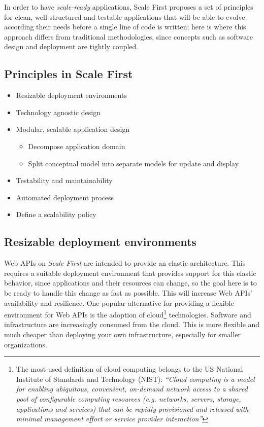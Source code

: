 \documentclass[10pt,article]{IEEEtran}
\begin{document}
In order to have \textit{scale-ready} applications, Scale First proposes a set of principles for clean, well-structured and testable applications that will be able to evolve according their needs before a single line of code is written; here is where this approach differs from traditional methodologies, since concepts such as software design and deployment are tightly coupled. 

 
\subsection{Principles in Scale First}
\begin{itemize}
    \item Resizable deployment environments
    \item Technology agnostic design
    \item Modular, scalable application design
    \begin{itemize}
        \item Decompose application domain 
        \item Split conceptual model into separate models for update and display
    \end{itemize}
    \item Testability and maintainability
    \item Automated deployment process
    \item Define a scalability policy
\end{itemize}

\subsection{Resizable deployment environments}
Web APIs on \textit{Scale First} are intended to provide an elastic architecture. This requires a suitable deployment environment that provides support for this elastic behavior, since applications and their resources can change, so the goal here is to be ready to handle this change as fast as possible. This will increase Web APIs' availability and resilience. One popular alternative for providing a flexible environment for Web APIs is the adoption of cloud\footnote{The most-used definition of cloud computing belongs to the US National Institute of Standards and Technology (NIST): \textit{``Cloud computing is a model for enabling ubiquitous, convenient, on-demand network access to a shared pool of configurable computing resources (e.g. networks, servers, storage, applications and services) that can be rapidly provisioned and released with minimal management effort or service provider interaction\cite{nist:cloud-definition}''}} technologies. Software and infrastructure are increasingly consumed from the cloud. This is more flexible and much cheaper than deploying your own infrastructure, especially for smaller organizations.
\end{document}

